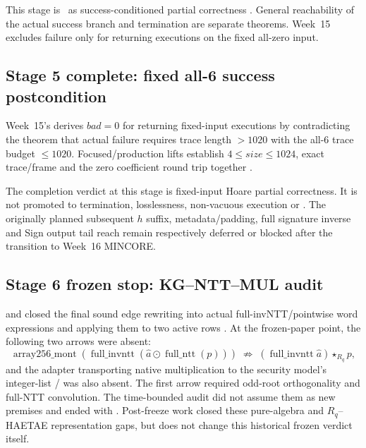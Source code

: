 This stage is \statusproved\ as success-conditioned partial correctness
\cite{week14-report,hbz-full-wrapper-composition}. General reachability of the
actual success branch and termination are separate theorems. Week~15 excludes
failure only for returning executions on the fixed all-zero input.

\subsection{Stage 5 complete: fixed all-6 success postcondition}

Week~15's  derives \(bad=0\)
for returning fixed-input executions by contradicting the theorem that actual
failure requires trace length \(>1020\) with the all-6 trace budget \(\le1020\).
Focused/production lifts establish \(4\le size\le1024\), exact trace/frame
and the zero coefficient round trip together
\cite{week15-report,rans-actual-success-witness}.

The completion verdict at this stage is fixed-input Hoare partial correctness.
It is not promoted to termination, losslessness, non-vacuous execution or
. The originally planned subsequent \(h\) suffix,
metadata/padding, full signature inverse and Sign output tail reach remain
respectively deferred or blocked after the transition to Week~16 MINCORE.

\subsection{Stage 6 frozen stop: KG--NTT--MUL audit}

 and
 closed the final sound
edge rewriting  into actual
full-invNTT/pointwise word expressions and applying them to two active rows
\cite{week16-kg-ntt-mul-report}. At the frozen-paper point, the following two
arrows were absent:
\[
  \operatorname{array256\_mont}
    (\operatorname{full\_invntt}(\widehat a\odot\operatorname{full\_ntt}(p)))
  \;\not\Longrightarrow\;
  (\operatorname{full\_invntt}\widehat a)\star_{R_q}p,
\]
and the adapter transporting native  multiplication to the
security model's integer-list /
was also absent. The first arrow required odd-root orthogonality and full-NTT
convolution. The time-bounded audit did not assume them as new premises and
ended with . Post-freeze work closed these pure-algebra
and \(R_q\)--HAETAE representation gaps, but does not change this historical
frozen verdict itself.

